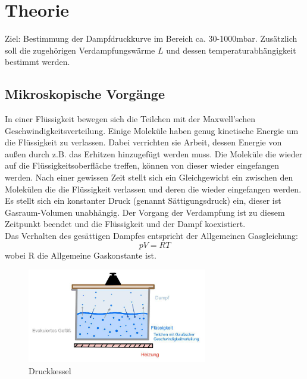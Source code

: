 \section{Theorie}
\label{sec:theorie}
Ziel: Bestimmung der Dampfdruckkurve im Bereich ca. 30-1000mbar.
Zusätzlich soll die zugehörigen Verdampfungswärme $L$ und dessen temperaturabhängigkeit bestimmt werden.\\

\subsection{Mikroskopische Vorgänge}
In einer Flüssigkeit bewegen sich die Teilchen mit der Maxwell'schen Geschwindigkeitsverteilung.
Einige Moleküle haben genug kinetische Energie um die Flüssigkeit zu verlassen.
Dabei verrichten sie Arbeit, dessen Energie von außen durch z.B. das Erhitzen hinzugefügt werden muss.
Die Moleküle die wieder auf die Flüssigkeitsoberfläche treffen, können von dieser wieder eingefangen werden.
Nach einer gewissen Zeit stellt sich ein Gleichgewicht ein zwischen den Molekülen die die Flüssigkeit verlassen und deren
die wieder eingefangen werden.
Es stellt sich ein konstanter Druck (genannt Sättigungsdruck) ein, dieser ist Gasraum-Volumen unabhängig. 
Der Vorgang der Verdampfung ist zu diesem Zeitpunkt beendet und
die Flüssigkeit und der Dampf koexistiert.\\
Das Verhalten des gesättigen Dampfes entspricht der Allgemeinen Gasgleichung:
\begin{equation}
    pV=RT
    \label{eqn:gasgl}
\end{equation}
wobei R die Allgemeine Gaskonstante ist.

\begin{figure}
    \centering
    \includegraphics[width=0.7\textwidth]{bilder/kessel.jpg}
    \caption{Druckkessel}
    \label{fig:kessel}
\end{figure}

